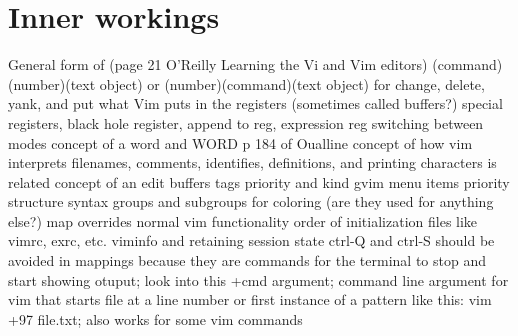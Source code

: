 \documentclass[12pt]{book}
\begin{document}
\section{Inner workings}
General form of (page 21 O'Reilly Learning the Vi and Vim editors) (command)(number)(text object) or (number)(command)(text object) for change, delete, yank, and put
what Vim puts in the registers (sometimes called buffers?) special registers, black hole register, append to reg, expression reg
switching between modes
concept of a word and WORD p 184 of Oualline
  concept of how vim interprets filenames, comments, identifies, definitions, and printing characters is related
concept of an edit
buffers
tags priority and kind
gvim menu items priority structure
syntax groups and subgroups for coloring (are they used for anything else?)
map overrides normal vim functionality
order of initialization files like vimrc, exrc, etc.
viminfo and retaining session state
ctrl-Q and ctrl-S should be avoided in mappings because they are commands for the terminal to stop and start showing otuput; look into this
+cmd argument; command line argument for vim that starts file at a line number or first instance of a pattern like this: vim +97 file.txt; also works for some vim commands
\end{document}
